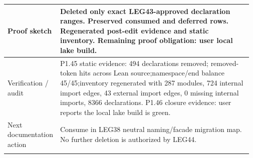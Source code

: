 \begin{longtable}{L{0.16\linewidth} L{0.81\linewidth}}
\hline\addlinespace[0.20em]
Proof sketch & Deleted only exact LEG43-approved declaration ranges. Preserved consumed and deferred rows. Regenerated post-edit evidence and static inventory. Remaining proof obligation: user local lake build.\\
\hline\addlinespace[0.20em]
Verification /\allowbreak{} audit & P1.45 static evidence: 494 declarations removed; removed-token hits across Lean source;\newline namespace/\allowbreak{}end balance 45/\allowbreak{}45;\newline inventory regenerated with 287 modules, 724 internal import edges, 43 external import edges, 0 missing internal imports, 8366 declarations. P1.46 closure evidence: user reports the local lake build is green.\\
\hline\addlinespace[0.20em]
Next documentation action & Consume in LEG38 neutral naming/\allowbreak{}facade migration map. No further deletion is authorized by LEG44.\\
\hline\addlinespace[0.20em]
\end{longtable}
